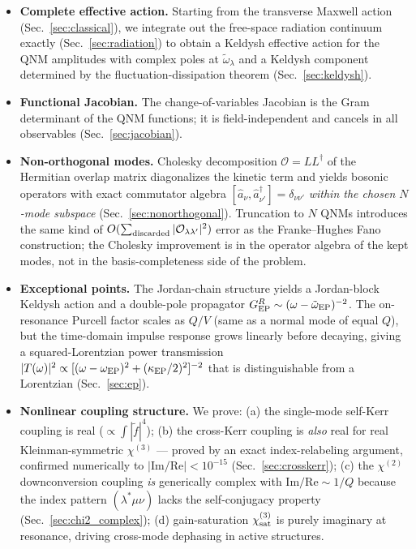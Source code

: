 \documentclass[12pt]{article}
\newcommand{\calO}{\mathcal{O}}
\begin{document}
\begin{itemize}
  \item \textbf{Complete effective action.}  Starting from the transverse
    Maxwell action (Sec.~\ref{sec:classical}), we integrate out the
    free-space radiation continuum exactly (Sec.~\ref{sec:radiation})
    to obtain a Keldysh effective action for the QNM amplitudes with
    complex poles at $\tilde{\omega}_\lambda$ and a Keldysh component
    determined by the fluctuation-dissipation theorem
    (Sec.~\ref{sec:keldysh}).

  \item \textbf{Functional Jacobian.}  The change-of-variables Jacobian
    is the Gram determinant of the QNM functions; it is field-independent
    and cancels in all observables (Sec.~\ref{sec:jacobian}).

  \item \textbf{Non-orthogonal modes.}  Cholesky decomposition
    $\mathcal{O}=LL^\dagger$ of the Hermitian overlap matrix
    diagonalizes the kinetic term and yields bosonic operators with
    exact commutator algebra $[\hat a_\nu,\hat a_{\nu'}^\dagger]=
    \delta_{\nu\nu'}$ \emph{within the chosen $N$-mode subspace}
    (Sec.~\ref{sec:nonorthogonal}).  Truncation to $N$ QNMs introduces
    the same kind of $O(\sum_{\rm discarded}|\calO_{\lambda\lambda'}|^2)$
    error as the Franke--Hughes Fano construction; the Cholesky improvement
    is in the operator algebra of the kept modes, not in the basis-completeness
    side of the problem.

  \item \textbf{Exceptional points.}  The Jordan-chain structure yields
    a Jordan-block Keldysh action and a double-pole propagator
    $G^R_{\rm EP}\sim(\omega-\tilde{\omega}_{\rm EP})^{-2}$.  The on-resonance
    Purcell factor scales as $Q/V$ (same as a normal mode of equal $Q$),
    but the time-domain impulse response grows linearly before decaying,
    giving a squared-Lorentzian power transmission $|T(\omega)|^2\propto
    [(\omega-\omega_{\rm EP})^2+(\kappa_{\rm EP}/2)^2]^{-2}$
    that is distinguishable from a Lorentzian (Sec.~\ref{sec:ep}).

  \item \textbf{Nonlinear coupling structure.}  We prove:
    (a) the single-mode self-Kerr coupling is real ($\propto\int|\tilde{f}|^4$);
    (b) the cross-Kerr coupling is \emph{also} real for real
    Kleinman-symmetric $\chi^{(3)}$ --- proved by an exact index-relabeling
    argument, confirmed numerically to $|\mathrm{Im}/\mathrm{Re}|<10^{-15}$
    (Sec.~\ref{sec:crosskerr}); (c) the $\chi^{(2)}$ downconversion coupling
    \emph{is} generically complex with $\mathrm{Im}/\mathrm{Re}\sim 1/Q$
    because the index pattern $(\lambda^*\mu\nu)$ lacks the self-conjugacy
    property (Sec.~\ref{sec:chi2_complex}); (d) gain-saturation
    $\chi^{(3)}_{\rm sat}$ is purely imaginary at resonance, driving
    cross-mode dephasing in active structures.


\end{itemize}
\end{document}
